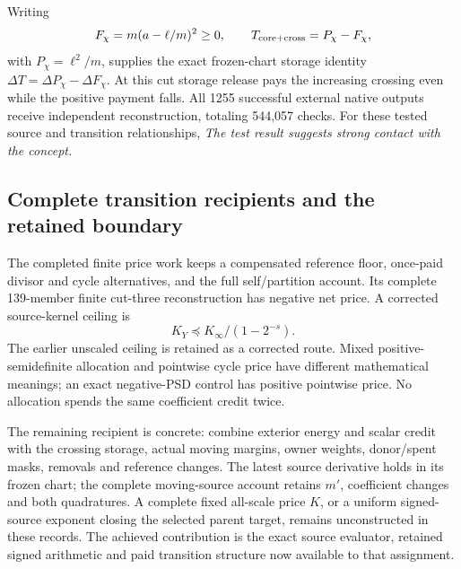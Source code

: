 Writing
\[
 F_\chi=m(a-\ell/m)^2\geq0,\qquad
 T_{\rm core+cross}=P_\chi-F_\chi,
\]
with \(P_\chi=\ell^2/m\), supplies the exact frozen-chart storage
identity \(\Delta T=\Delta P_\chi-\Delta F_\chi\).
At this cut storage release pays the increasing crossing even while
the positive payment falls. All 1255 successful external native
outputs receive independent reconstruction, totaling 544,057
checks. For these tested source and transition relationships,
\emph{The test result suggests strong contact with the concept.}

\subsection{Complete transition recipients and the retained boundary}

The completed finite price work keeps a compensated reference floor,
once-paid divisor and cycle alternatives, and the full self/partition
account. Its complete 139-member finite cut-three reconstruction has
negative net price. A corrected source-kernel ceiling is
\[
 K_Y\preceq K_\infty/(1-2^{-s}).
\]
The earlier unscaled ceiling is retained as a corrected route.
Mixed positive-semidefinite allocation and pointwise cycle price
have different mathematical meanings; an exact negative-PSD control
has positive pointwise price. No allocation spends the same
coefficient credit twice.

The remaining recipient is concrete: combine exterior energy and
scalar credit with the crossing storage, actual moving margins,
owner weights, donor/spent masks, removals and reference changes.
The latest source derivative holds in its frozen chart; the complete
moving-source account retains \(m'\), coefficient changes and both
quadratures. A complete fixed all-scale price \(K\), or a uniform
signed-source exponent closing the selected parent target, remains
unconstructed in these records. The achieved contribution is the
exact source evaluator, retained signed arithmetic and paid
transition structure now available to that assignment.
